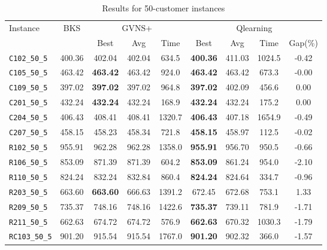 \begin{table}[ht]
\centering
\small
\setlength{\tabcolsep}{5pt}
\caption{Results for 50-customer instances}
\vspace{4mm}
\begin{adjustbox}{width=\textwidth}
\begin{tabular}{l c c c c @{\hspace{8pt}} c c c c @{\hspace{8pt}}}
\toprule
\multirow{2}{*}{Instance} & \multirow{2}{*}{BKS} & \multicolumn{3}{c}{GVNS+} & \multicolumn{4}{c}{Qlearning} \\
\cmidrule(lr){3-5} \cmidrule(lr){6-9}
 &  & Best & Avg & Time & Best & Avg & Time & Gap(\%) \\
\midrule
\texttt{C102\_50\_5} & 400.36 & 402.04 & 402.04 & 634.5 & \textbf{400.36} & 411.03 & 1024.5 & -0.42 \\
\texttt{C105\_50\_5} & 463.42 & \textbf{463.42} & 463.42 & 924.0 & \textbf{463.42} & 463.42 & 673.3 & -0.00 \\
\texttt{C109\_50\_5} & 397.02 & \textbf{397.02} & 397.02 & 964.8 & \textbf{397.02} & 402.09 & 456.6 & 0.00 \\
\texttt{C201\_50\_5} & 432.24 & \textbf{432.24} & 432.24 & 168.9 & \textbf{432.24} & 432.24 & 175.2 & 0.00 \\
\texttt{C204\_50\_5} & 406.43 & 408.41 & 408.41 & 1320.7 & \textbf{406.43} & 407.18 & 1654.9 & -0.49 \\
\texttt{C207\_50\_5} & 458.15 & 458.23 & 458.34 & 721.8 & \textbf{458.15} & 458.97 & 112.5 & -0.02 \\
\texttt{R102\_50\_5} & 955.91 & 962.28 & 962.28 & 1358.0 & \textbf{955.91} & 956.70 & 950.5 & -0.66 \\
\texttt{R106\_50\_5} & 853.09 & 871.39 & 871.39 & 604.2 & \textbf{853.09} & 861.24 & 954.0 & -2.10 \\
\texttt{R110\_50\_5} & 824.24 & 832.24 & 832.84 & 860.4 & \textbf{824.24} & 824.64 & 334.7 & -0.96 \\
\texttt{R203\_50\_5} & 663.60 & \textbf{663.60} & 666.63 & 1391.2 & 672.45 & 672.68 & 753.1 & 1.33 \\
\texttt{R209\_50\_5} & 735.37 & 748.16 & 748.16 & 1422.6 & \textbf{735.37} & 739.11 & 781.9 & -1.71 \\
\texttt{R211\_50\_5} & 662.63 & 674.72 & 674.72 & 576.9 & \textbf{662.63} & 670.32 & 1030.3 & -1.79 \\
\texttt{RC103\_50\_5} & 901.20 & 915.54 & 915.54 & 1767.0 & \textbf{901.20} & 902.32 & 366.0 & -1.57 \\

\end{tabular}
\end{adjustbox}
\end{table}
